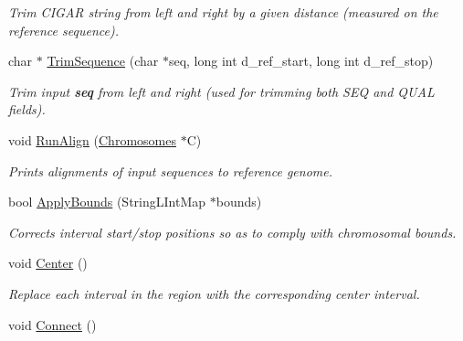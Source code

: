 \begin{CompactItemize}
\begin{CompactList}\small\item\em Trim CIGAR string from left and right by a given distance (measured on the reference sequence). \item\end{CompactList}\item 
\hypertarget{classGenomicRegionSAM_0ff4472118291a8034efc929c784680c}{
char $\ast$ \hyperlink{classGenomicRegionSAM_0ff4472118291a8034efc929c784680c}{TrimSequence} (char $\ast$seq, long int d\_\-ref\_\-start, long int d\_\-ref\_\-stop)}
\label{classGenomicRegionSAM_0ff4472118291a8034efc929c784680c}

\begin{CompactList}\small\item\em Trim input {\bf seq} from left and right (used for trimming both SEQ and QUAL fields). \item\end{CompactList}\item 
\hypertarget{classGenomicRegionSAM_97b9fec94e5f21490d839b3f99235a96}{
void \hyperlink{classGenomicRegionSAM_97b9fec94e5f21490d839b3f99235a96}{RunAlign} (\hyperlink{classChromosomes}{Chromosomes} $\ast$C)}
\label{classGenomicRegionSAM_97b9fec94e5f21490d839b3f99235a96}

\begin{CompactList}\small\item\em Prints alignments of input sequences to reference genome. \item\end{CompactList}\item 
\hypertarget{classGenomicRegionSAM_7315b920fcc6ef84f1ecaee5f842fa82}{
bool \hyperlink{classGenomicRegionSAM_7315b920fcc6ef84f1ecaee5f842fa82}{ApplyBounds} (StringLIntMap $\ast$bounds)}
\label{classGenomicRegionSAM_7315b920fcc6ef84f1ecaee5f842fa82}

\begin{CompactList}\small\item\em Corrects interval start/stop positions so as to comply with chromosomal bounds. \item\end{CompactList}\item 
\hypertarget{classGenomicRegionSAM_52fa8c0420b16fe92f54427365f72899}{
void \hyperlink{classGenomicRegionSAM_52fa8c0420b16fe92f54427365f72899}{Center} ()}
\label{classGenomicRegionSAM_52fa8c0420b16fe92f54427365f72899}

\begin{CompactList}\small\item\em Replace each interval in the region with the corresponding center interval. \item\end{CompactList}\item 
\hypertarget{classGenomicRegionSAM_d765c84814151be0e710fefb37c7949a}{
void \hyperlink{classGenomicRegionSAM_d765c84814151be0e710fefb37c7949a}{Connect} ()}
\label{classGenomicRegionSAM_d765c84814151be0e710fefb37c7949a}


\end{CompactItemize}
